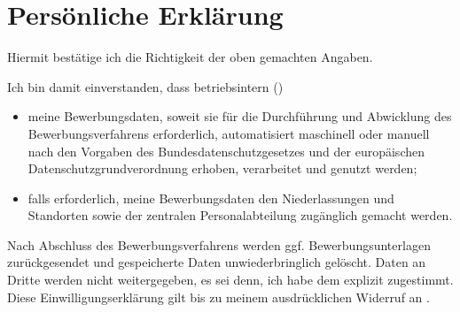 \documentclass[
	a4paper,
	fontsize=12
]{scrartcl}
\begin{document}
\newcommand{\PageFillImage}[1]{%
	\begin{minipage}[b]{\textwidth}
		\centering\fcolorbox{RoyalBlue}{white}{
			\texttt{[image: \\CVDataPath/\#1]}
		}
	\end{minipage}
	\newpage
}%

\CVDocs

\section{Persönliche Erklärung}

Hiermit bestätige ich die Richtigkeit der oben gemachten Angaben.

Ich bin damit einverstanden, dass betriebsintern (\RecpCompany)
\begin{itemize}\itemsep0em
\item meine Bewerbungsdaten, soweit sie für die Durchführung und Abwicklung des Bewerbungsverfahrens erforderlich, automatisiert maschinell oder manuell nach den Vorgaben des Bundesdatenschutzgesetzes und der europäischen Datenschutzgrundverordnung erhoben, verarbeitet und genutzt werden;
\item falls erforderlich, meine Bewerbungsdaten den Niederlassungen und Standorten sowie der zentralen Personalabteilung zugänglich gemacht werden.
\end{itemize}
Nach Abschluss des Bewerbungsverfahrens werden ggf. Bewerbungsunterlagen zurückgesendet und gespeicherte Daten unwiederbringlich gelöscht. Daten an Dritte werden nicht weitergegeben, es sei denn, ich habe dem explizit zugestimmt. Diese Einwilligungserklärung gilt bis zu meinem ausdrücklichen Widerruf an \RecpEmail.

\vfill
\MySignature
\vfill\vfill\vfill
\end{document}
